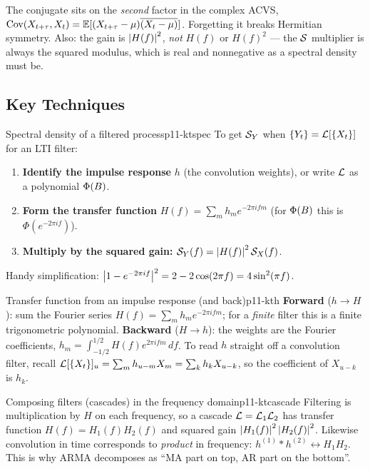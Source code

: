 \begin{pitfall}
The conjugate sits on the \emph{second} factor in the complex ACVS,
$\operatorname{Cov}(X_{t+\tau},X_t)=\mathbb{E}[(X_{t+\tau}-\mu)\overline{(X_t-\mu)}]$. Forgetting it
breaks Hermitian symmetry. Also: the gain is $\left\lvert H(f) \right\rvert^2$, \emph{not} $H(f)$
or $H(f)^2$ --- the $\mathcal{S}$ multiplier is always the squared modulus, which is
real and nonnegative as a spectral density must be.
\end{pitfall}

\subsection{Key Techniques}

\begin{keytech}{Spectral density of a filtered process}{p11-ktspec}
To get $\mathcal{S}_Y$ when $\{Y_t\}=\mathcal{L}[\{X_t\}]$ for an LTI filter:
\begin{enumerate}
  \item \textbf{Identify the impulse response} $h$ (the convolution weights), or
        write $\mathcal{L}$ as a polynomial $\Phi(B)$.
  \item \textbf{Form the transfer function}
        $H(f)=\sum_m h_m e^{-2\pi i f m}$ (for $\Phi(B)$ this is
        $\Phi(e^{-2\pi i f})$).
  \item \textbf{Multiply by the squared gain:}
        $\mathcal{S}_Y(f)=\left\lvert H(f) \right\rvert^2\mathcal{S}_X(f)$.
\end{enumerate}
Handy simplification: $\left\lvert 1-e^{-2\pi i f} \right\rvert^2=2-2\cos(2\pi f)=4\sin^2(\pi f)$.
\end{keytech}

\begin{keytech}{Transfer function from an impulse response (and back)}{p11-kth}
\textbf{Forward} ($h\to H$): sum the Fourier series
$H(f)=\sum_m h_m e^{-2\pi i f m}$; for a \emph{finite} filter this is a finite
trigonometric polynomial. \textbf{Backward} ($H\to h$): the weights are the
Fourier coefficients, $h_m=\int_{-1/2}^{1/2}H(f)e^{2\pi i f m}\,df$. To read $h$
straight off a convolution filter, recall $\mathcal{L}[\{X_t\}]_u=\sum_m h_{u-m}X_m
=\sum_k h_k X_{u-k}$, so the coefficient of $X_{u-k}$ is $h_k$.
\end{keytech}

\begin{keytech}{Composing filters (cascades) in the frequency domain}{p11-ktcascade}
Filtering is multiplication by $H$ on each frequency, so a cascade
$\mathcal{L}=\mathcal{L}_1\mathcal{L}_2$ has transfer function $H(f)=H_1(f)H_2(f)$ and squared
gain $\left\lvert H_1(f) \right\rvert^2\left\lvert H_2(f) \right\rvert^2$. Likewise convolution in time corresponds to
\emph{product} in frequency: $h^{(1)}*h^{(2)}\leftrightarrow H_1 H_2$. This is
why ARMA decomposes as ``MA part on top, AR part on the bottom''.
\end{keytech}

